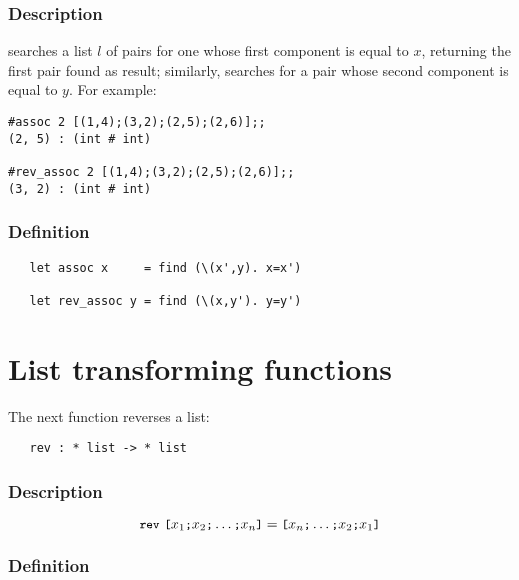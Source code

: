 \subsubsection*{Description}

 searches a list $l$ of pairs for one whose first component is
equal to $x$, returning the first pair found as result; similarly, 
 searches for a pair whose second component is equal
to $y$. For example:

\setcounter{sessioncount}{1}
\begin{session}\begin{verbatim}
#assoc 2 [(1,4);(3,2);(2,5);(2,6)];;
(2, 5) : (int # int)

#rev_assoc 2 [(1,4);(3,2);(2,5);(2,6)];;
(3, 2) : (int # int)
\end{verbatim}\end{session}

\subsubsection*{Definition}

\begin{hol}\begin{verbatim}
   let assoc x     = find (\(x',y). x=x')

   let rev_assoc y = find (\(x,y'). y=y')
\end{verbatim}\end{hol}


\section{List transforming functions}

\noindent The next function reverses a list:

\begin{boxed}
\begin{verbatim}
   rev : * list -> * list
\end{verbatim}\end{boxed}

\subsubsection*{Description}

\[ \ml{rev}\ \ml{[}x_1\ml{;}x_2\ml{;}\ldots\ml{;}x_n\ml{]} =
\ml{[}x_n\ml{;}\ldots\ml{;}x_2\ml{;}x_1\ml{]} \]

\subsubsection*{Definition}

